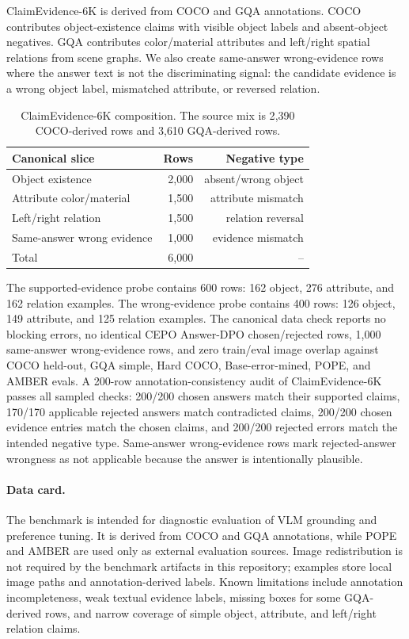 \documentclass[10pt,twocolumn,letterpaper]{article}
\newcommand{\dataset}{ClaimEvidence-6K}
\newcommand{\answerdpo}{CEPO Answer-DPO}
\begin{document}
\dataset{} is derived from COCO and GQA annotations. COCO contributes
object-existence claims with visible object labels and absent-object negatives.
GQA contributes color/material attributes and left/right spatial relations from
scene graphs. We also create same-answer wrong-evidence rows where the answer
text is not the discriminating signal: the candidate evidence is a wrong object
label, mismatched attribute, or reversed relation.

\begin{table}[t]
\centering
\small
\begin{tabular}{lrr}
\toprule
Canonical slice & Rows & Negative type \\
\midrule
Object existence & 2{,}000 & absent/wrong object \\
Attribute color/material & 1{,}500 & attribute mismatch \\
Left/right relation & 1{,}500 & relation reversal \\
Same-answer wrong evidence & 1{,}000 & evidence mismatch \\
\midrule
Total & 6{,}000 & -- \\
\bottomrule
\end{tabular}
\caption{\dataset{} composition. The source mix is 2{,}390 COCO-derived rows
and 3{,}610 GQA-derived rows.}
\label{tab:data}
\end{table}

The supported-evidence probe contains 600 rows: 162 object, 276 attribute, and
162 relation examples. The wrong-evidence probe contains 400 rows: 126 object,
149 attribute, and 125 relation examples. The canonical data check reports no
blocking errors, no identical \answerdpo{} chosen/rejected rows, 1{,}000
same-answer wrong-evidence rows, and zero train/eval image overlap against
COCO held-out, GQA simple, Hard COCO, Base-error-mined, POPE, and AMBER evals.
A 200-row annotation-consistency audit of \dataset{} passes all sampled checks:
200/200 chosen answers match their supported claims, 170/170 applicable
rejected answers match contradicted claims, 200/200 chosen evidence entries
match the chosen claims, and 200/200 rejected errors match the intended
negative type. Same-answer wrong-evidence rows mark rejected-answer wrongness
as not applicable because the answer is intentionally plausible.

\paragraph{Data card.}
The benchmark is intended for diagnostic evaluation of VLM grounding and
preference tuning. It is derived from COCO and GQA annotations, while POPE and
AMBER are used only as external evaluation sources. Image redistribution is
not required by the benchmark artifacts in this repository; examples store
local image paths and annotation-derived labels. Known limitations include
annotation incompleteness, weak textual evidence labels, missing boxes for some
GQA-derived rows, and narrow coverage of simple object, attribute, and
left/right relation claims.
\end{document}
